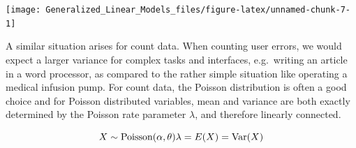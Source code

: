 \documentclass[]{svmono}
\newenvironment{Shaded}{\begin{snugshade}}{\end{snugshade}}
\newcommand{\KeywordTok}[1]{\textcolor[rgb]{0.13,0.29,0.53}{\textbf{#1}}}
\newcommand{\DataTypeTok}[1]{\textcolor[rgb]{0.13,0.29,0.53}{#1}}
\newcommand{\DecValTok}[1]{\textcolor[rgb]{0.00,0.00,0.81}{#1}}
\newcommand{\StringTok}[1]{\textcolor[rgb]{0.31,0.60,0.02}{#1}}
\newcommand{\OperatorTok}[1]{\textcolor[rgb]{0.81,0.36,0.00}{\textbf{#1}}}
\newcommand{\NormalTok}[1]{#1}
\begin{document}
\begin{Shaded}
\end{Shaded}

\texttt{[image: Generalized\_Linear\_Models\_files/figure-latex/unnamed-chunk-7-1]}

A similar situation arises for count data. When counting user errors, we
would expect a larger variance for complex tasks and interfaces,
e.g.~writing an article in a word processor, as compared to the rather
simple situation like operating a medical infusion pump. For count data,
the Poisson distribution is often a good choice and for Poisson
distributed variables, mean and variance are both exactly determined by
the Poisson rate parameter \(\lambda\), and therefore linearly
connected.

\[
X \sim \textrm{Poisson}(\alpha, \theta)\\
\lambda = E(X) = \textrm{Var}(X)
\]

\begin{Shaded}
\end{Shaded}
\end{document}
